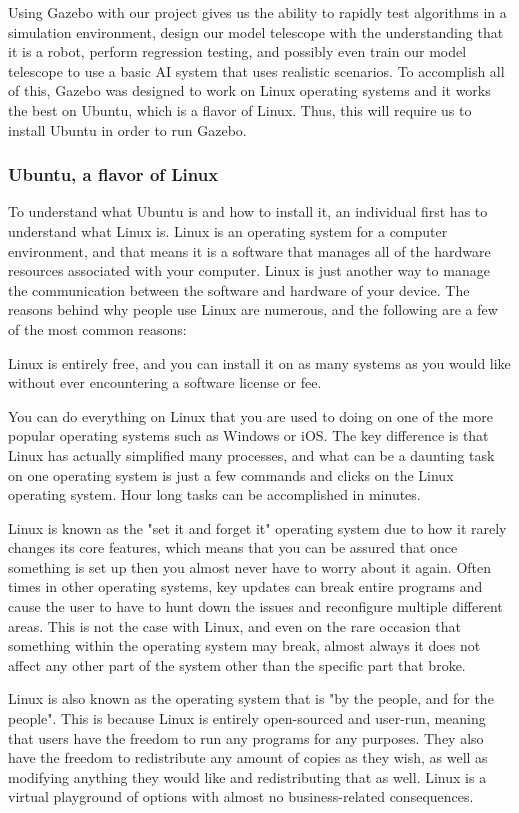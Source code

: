 \documentclass[12pt]{article}
\begin{document}
Using Gazebo with our project gives us the ability to rapidly test algorithms in a simulation environment, design our model telescope with the understanding that it is a robot, perform regression testing, and possibly even train our model telescope to use a basic AI system that uses realistic scenarios. To accomplish all of this, Gazebo was designed to work on Linux operating systems and it works the best on Ubuntu, which is a flavor of Linux. Thus, this will require us to install Ubuntu in order to run Gazebo.

\subsubsection{Ubuntu, a flavor of Linux}
To understand what Ubuntu is and how to install it, an individual first has to understand what Linux is. Linux is an operating system for a computer environment, and that means it is a software that manages all of the hardware resources associated with your computer. Linux is just another way to manage the communication between the software and hardware of your device.\cite{LinuxExplaination} The reasons behind why people use Linux are numerous, and the following are a few of the most common reasons:
\begin{description}[font=$\bullet$~\normalfont\scshape\color{red!50!black}]
	\item [Zero Cost of Entry] Linux is entirely free, and you can install it on as many systems as you would like without ever encountering a software license or fee.
	\item [Usability] You can do everything on Linux that you are used to doing on one of the more popular operating systems such as Windows or iOS. The key difference is that Linux has actually simplified many processes, and what can be a daunting task on one operating system is just a few commands and clicks on the Linux operating system. Hour long tasks can be accomplished in minutes.
	\item [System Administration] Linux is known as the "set it and forget it" operating system due to how it rarely changes its core features, which means that you can be assured that once something is set up then you almost never have to worry about it again. Often times in other operating systems, key updates can break entire programs and cause the user to have to hunt down the issues and reconfigure multiple different areas. This is not the case with Linux, and even on the rare occasion that something within the operating system may break, almost always it does not affect any other part of the system other than the specific part that broke.
	\item [Open Source Licensing] Linux is also known as the operating system that is "by the people, and for the people". This is because Linux is entirely open-sourced and user-run, meaning that users have the freedom to run any programs for any purposes. They also have the freedom to redistribute any amount of copies as they wish, as well as modifying anything they would like and redistributing that as well. Linux is a virtual playground of options with almost no business-related consequences.
\end{description}
\end{document}
